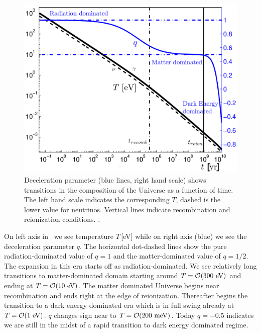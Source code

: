 \begin{figure}
\centerline{\includegraphics[width=0.88\linewidth]{01-introduction/Figures/Tqtoday.png}}
\caption{Deceleration parameter (blue lines, right hand scale) shows transitions in the composition of the Universe as a function of time. The left hand scale indicates the corresponding $T$, dashed is the lower value for neutrinos. Vertical lines indicate recombination and reionization conditions. .
\label{fig:today} }
\end{figure}

On left axis in~ we see temperature $T$\,[eV] while on right axis (blue) we see the deceleration parameter $q$. The horizontal dot-dashed lines show the pure radiation-dominated value of $q=1$ and the matter-dominated value of $q=1/2$. The expansion in this era starts off as radiation-dominated. We see relatively long transitions to matter-dominated domain starting around $T=\mathcal{O}(300\text{ eV})$ and ending at $T=\mathcal{O}(10\text{ eV})$. The matter dominated Universe begins near recombination and ends right at the edge of reionization. Thereafter begins the transition to a dark energy dominated era which is in full swing already at $T=\mathcal{O}(1\text{ eV})$. $q$ changes sign near to $T=\mathcal{O}(200\text{ meV})$. Today $q=-0.5$ indicates we are still in the midst of a rapid transition to dark energy dominated regime. 

